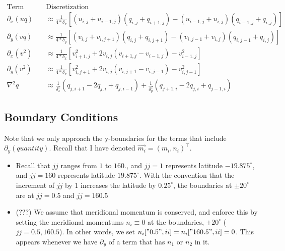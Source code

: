 \documentclass[10pt]{article}
\begin{document}
\begin{align*}
\text{Term} & \quad \text{Discretization}\\ \hline
\partial_x (uq)  & \quad \approx \frac{1}{4*\delta_x}\left[\left(u_{i,j}+u_{i+1,j}\right)\left(q_{i,j}+q_{i+1,j}\right)-\left(u_{i-1,j}+u_{i,j}\right)\left(q_{i-1,j}+q_{i,j}\right)\right]\\
\partial_y (vq) & \quad \approx \frac{1}{4*\delta_y}\left[\left(v_{i,j}+v_{i,j+1}\right)\left(q_{i,j}+q_{i,j+1}\right)-\left(v_{i,j-1}+v_{i,j}\right)\left(q_{i,j-1}+q_{i,j}\right)\right] \\
\partial_x (v^2) & \quad \approx \frac{1}{4*\delta_x}\left[v_{i+1,j}^2+2v_{i,j}\left(v_{i+1,j}-v_{i-1,j}\right)-v_{i-1,j}^2\right] \\
\partial_y (v^2) & \quad \approx  \frac{1}{4*\delta_x}\left[v_{i,j+1}^2+2v_{i,j}\left(v_{i,j+1}-v_{i,j-1}\right)-v_{i,j-1}^2\right] \\
\nabla ^2 q & \quad \approx \frac{1}{\delta_x^2}\left(q_{j,i+1}-2q_{j,i}+q_{j,i-1}\right) + \frac{1}{\delta_y^2}\left(q_{j+1,i}-2q_{j,i}+q_{j-1,i}\right)
\end{align*}

\subsection*{Boundary Conditions}

Note that we only approach the y-boundaries for the terms that include $\partial_y (quantity)$. Recall that I have denoted $\vec{m_i} = (m_i, n_i)^{\top}$.
\begin{itemize}
	\item Recall that $jj$ ranges from $1$ to $160$., and $jj=1$ represents latitude $-19.875 ^{\circ}$, and $jj=160$ represents latitude $19.875 ^{\circ}$. With the convention that the increment of $jj$ by $1$ increases the latitude by $0.25 ^{\circ}$, the boundaries at $\pm 20 ^{\circ}$ are at $jj = 0.5$ and $jj = 160.5$  
	\item (???) We assume that meridional momentum is conserved, and enforce this by setting the meridional momentums $n_i \equiv 0$ at the boundaries, $\pm 20 ^{\circ}$ ($jj = 0.5, 160.5$). In other words, we set $n_i["0.5", ii] = n_i["160.5", ii] = 0$. This appears whenever we have $\partial_y$ of a term that has $n_1$ or $n_2$ in it. 
\end{itemize}
\end{document}
